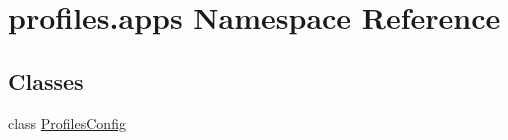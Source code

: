\hypertarget{namespaceprofiles_1_1apps}{}\section{profiles.\+apps Namespace Reference}
\label{namespaceprofiles_1_1apps}
\subsection*{Classes}
\begin{DoxyCompactItemize}
\item 
class \hyperlink{classprofiles_1_1apps_1_1ProfilesConfig}{Profiles\+Config}
\end{DoxyCompactItemize}
